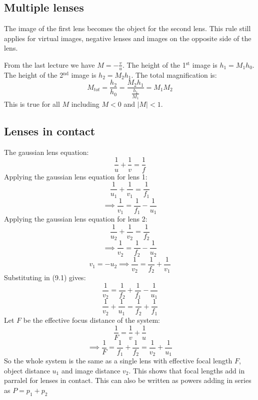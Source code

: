 \section{}

\subsection*{Multiple lenses}

The image of the first lens becomes the object for the second lens. This rule still applies for virtual images, negative lenses and images on the opposite side of the lens.

From the last lecture we have \(M=-\frac vu\). The height  of the 1\(^{\text{st}}\) image is \(h_1=M_1h_0\). The height of the 2\(^{\text{nd}}\) image is \(h_2=M_2h_1\). The total magnification is:
\[M_{tot}=\frac{h_2}{h_0}=\frac{M_2h_1}{\frac{h_1}{M_1}}=M_1M_2\]
This is true for all \(M\) including \(M<0\) and \(|M|<1\).

\subsection*{Lenses in contact}
\begin{center}
\end{center}
The gaussian lens equation:
\[\frac 1u+\frac 1v=\frac 1f\]
Applying the gaussian lens equation for lens 1:
\[\frac{1}{u_1}+\frac{1}{v_1}=\frac{1}{f_1}\]
\[\implies \frac{1}{v_1}=\frac{1}{f_1}-\frac{1}{u_1}\tag{9.1}\]
Applying the gaussian lens equation for lens 2:
\[\frac{1}{u_2}+\frac{1}{v_2}=\frac{1}{f_2}\]
\[\implies \frac{1}{v_2}=\frac{1}{f_2}-\frac{1}{u_2}\]
\[v_1=-u_2\implies\frac{1}{v_2}=\frac{1}{f_2}+\frac{1}{v_1}\]
Substituting in (9.1) gives:
\[\frac{1}{v_2}=\frac{1}{f_2}+\frac{1}{f_1}-\frac{1}{u_1}\]
\[\frac{1}{v_2}+\frac{1}{u_1}=\frac{1}{f_2}+\frac{1}{f_1}\]
Let \(F\) be the effective focus distance of the system:
\[\frac 1F=\frac{1}{v}+\frac{1}{u}\]
\[\implies \frac{1}{F}=\frac{1}{f_1}+\frac{1}{f_2}=\frac{1}{v_2}+\frac{1}{u_1}\]
So the whole system is the same as a single lens with effective focal length \(F\), object distance \(u_1\) and image distance \(v_2\). This shows that focal lengths add in parralel for lenses in contact. This can also be written as powers adding in series as \(P=p_1+p_2\)

